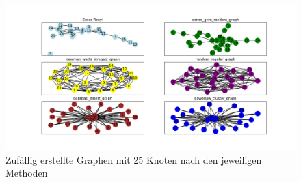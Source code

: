 \FloatBarrier
\begin{figure}[h!]
    \centering
    \hspace*{-1.5cm}
    \includegraphics[width=1.2\textwidth]{Graphics/6Random.png}
    \caption{Zufällig erstellte Graphen mit 25 Knoten nach den jeweiligen Methoden}
    \label{RandomGraphen}
\end{figure}
\newpage

